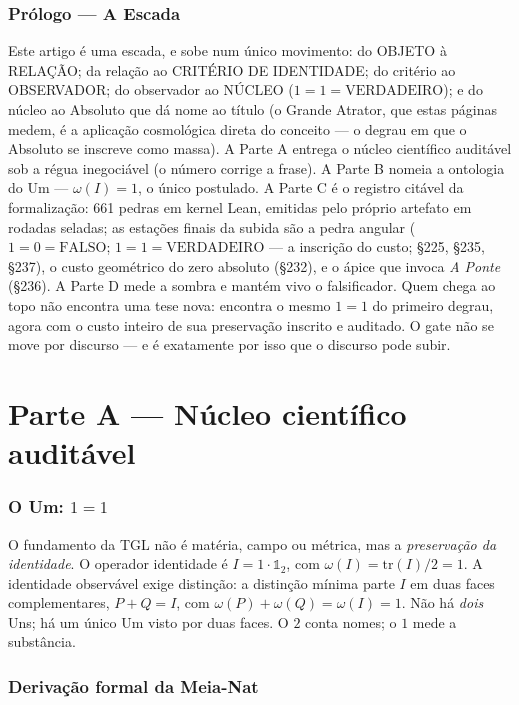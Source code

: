 \documentclass[11pt]{article}
\theoremstyle{definition}\newtheorem{deriv}{Derivação}
\begin{document}
\section*{Prólogo --- A Escada}

\noindent Este artigo é uma escada, e sobe num único movimento: do OBJETO à RELAÇÃO; da relação ao CRITÉRIO DE IDENTIDADE; do critério ao OBSERVADOR; do observador ao NÚCLEO ($1{=}1{=}\mathrm{VERDADEIRO}$); e do núcleo ao Absoluto que dá nome ao título (o Grande Atrator, que estas páginas medem, é a aplicação cosmológica direta do conceito --- o degrau em que o Absoluto se inscreve como massa). A Parte A entrega o núcleo científico auditável sob a régua inegociável (o número corrige a frase). A Parte B nomeia a ontologia do Um --- $\omega(I){=}1$, o único postulado. A Parte C é o registro citável da formalização: 661 pedras em kernel Lean, emitidas pelo próprio artefato em rodadas seladas; as estações finais da subida são a pedra angular ($1{=}0{=}\mathrm{FALSO}$; $1{=}1{=}\mathrm{VERDADEIRO}$ --- a inscrição do custo; \S225, \S235, \S237), o custo geométrico do zero absoluto (\S232), e o ápice que invoca \emph{A Ponte} (\S236). A Parte D mede a sombra e mantém vivo o falsificador. Quem chega ao topo não encontra uma tese nova: encontra o mesmo $1{=}1$ do primeiro degrau, agora com o custo inteiro de sua preservação inscrito e auditado. O gate não se move por discurso --- e é exatamente por isso que o discurso pode subir.

\part{Parte A --- Núcleo científico auditável}

\section{O Um: $1=1$}

O fundamento da TGL não é matéria, campo ou métrica, mas a \emph{preservação da identidade}. O operador identidade é $I=1\cdot\mathbb{1}_2$, com $\omega(I)=\mathrm{tr}(I)/2=1$. A identidade observável exige distinção: a distinção mínima parte $I$ em duas faces complementares, $P+Q=I$, com $\omega(P)+\omega(Q)=\omega(I)=1$. Não há \emph{dois} Uns; há um único Um visto por duas faces. O $2$ conta nomes; o $1$ mede a substância.

\section{Derivação formal da Meia-Nat}
\end{document}
